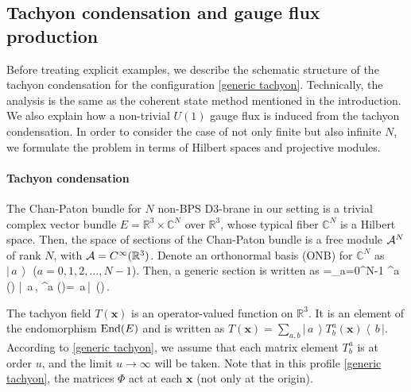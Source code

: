 \documentclass[12pt]{article}
\numberwithin{equation}{section}
\newcommand{\Bra}[1]{\left\langle\, #1\,\right|}
\newcommand{\Ket}[1]{\left|\, #1\,\right\rangle}
\newcommand{\Bracket}[2]{\left\langle\, #1\,|\, #2\,\right\rangle}
\def\real{\mathbb{R}}
\def\complex{\mathbb{C}}
\def\bea#1\ena{\begin{align}#1\end{align}}
\begin{document}
\subsection{Tachyon condensation and gauge flux production}

Before treating explicit examples, we describe the schematic structure 
of the tachyon condensation for the configuration \eqref{generic tachyon}.
Technically, the analysis is the same as the coherent state method mentioned in the introduction.
We also explain how a non-trivial $U(1)$ gauge flux is induced from the tachyon condensation. 
{In order to consider the case of not only finite but also infinite $N$, we}
formulate the problem in terms 
of Hilbert spaces and projective modules.


\paragraph{Tachyon condensation}

The Chan-Paton bundle for $N$ non-BPS D3-brane in our setting 
is a trivial complex vector bundle $E=\real^3 \times \complex^N$ over $\real^3$,
whose typical fiber $\complex^N$ is a Hilbert space.
Then, the space of sections of the Chan-Paton bundle is a free module ${\cal A}^N$ of rank $N$,
with ${\cal A}=C^\infty (\real^3)$.
Denote an orthonormal basis (ONB) for $\complex^N$ as $\Ket{a}$ ($a=0,1,2,\ldots,N-1$).
Then, a generic section is written as
\bea
\Ket{\psi(\boldsymbol{x})}=\sum_{a=0}^{N-1} \psi^a () \Ket{a},
\quad \psi^a ()=\Bracket{a}{\psi(\boldsymbol{x})}.
\ena

The tachyon field $T(\boldsymbol{x})$ is an operator-valued function on $\real^3$.
It is an element of the endomorphism ${\rm End}(E)$ and 
is written as 
$T(\boldsymbol{x})=\sum_{a,b}\Ket{a}T^a_b(\boldsymbol{x})\Bra{b}$.
According to \eqref{generic tachyon}, 
we assume that each matrix element $T^a_b$ is at order $u$,
and the limit $u\to \infty$ will be taken.
Note that in this profile \eqref{generic tachyon}, the matrices $\Phi$ act at each 
$\boldsymbol{x}$ (not only at the origin).
\end{document}
